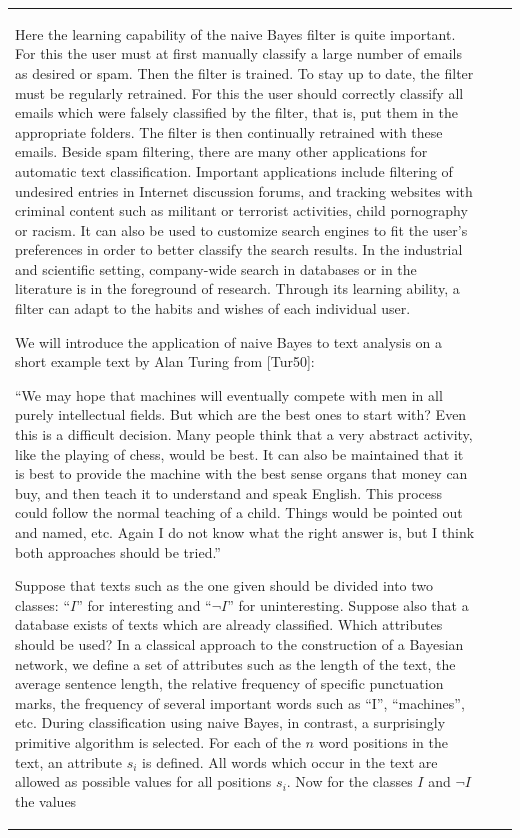 \documentclass[10pt]{book}
\begin{document}
\begin{center}
\begin{tabular}{|l|l|l|}
Here the learning capability of the naive Bayes filter is quite important. For this the user must at first manually classify a large number of emails as desired or spam. Then the filter is trained. To stay up to date, the filter must be regularly retrained. For this the user should correctly classify all emails which were falsely classified by the filter, that is, put them in the appropriate folders. The filter is then continually retrained with these emails.
Beside spam filtering, there are many other applications for automatic text classification. Important applications include filtering of undesired entries in Internet discussion forums, and tracking websites with criminal content such as militant or terrorist activities, child pornography or racism. It can also be used to customize search engines to fit the user's preferences in order to better classify the search results. In the industrial and scientific setting, company-wide search in databases or in the literature is in the foreground of research. Through its learning ability, a filter can adapt to the habits and wishes of each individual user.

We will introduce the application of naive Bayes to text analysis on a short example text by Alan Turing from [Tur50]:

\begin{displayquote}
``We may hope that machines will eventually compete with men in all purely intellectual fields. But which are the best ones to start with? Even this is a difficult decision. Many people think that a very abstract activity, like the playing of chess, would be best. It can also be maintained that it is best to provide the machine with the best sense organs that money can buy, and then teach it to understand and speak English. This process could follow the normal teaching of a child. Things would be pointed out and named, etc. Again I do not know what the right answer is, but I think both approaches should be tried.''
\end{displayquote}

Suppose that texts such as the one given should be divided into two classes: ``$I$'' for interesting and ``$\neg I$'' for uninteresting. Suppose also that a database exists of texts which are already classified. Which attributes should be used? In a classical approach to the construction of a Bayesian network, we define a set of attributes such as the length of the text, the average sentence length, the relative frequency of specific punctuation marks, the frequency of several important words such as ``I'', ``machines'', etc. During classification using naive Bayes, in contrast, a surprisingly primitive algorithm is selected. For each of the $n$ word positions in the text, an attribute $s_{i}$ is defined. All words which occur in the text are allowed as possible values for all positions $s_{i}$. Now for the classes $I$ and $\neg I$ the values


\end{tabular}
\end{center}
\end{document}
